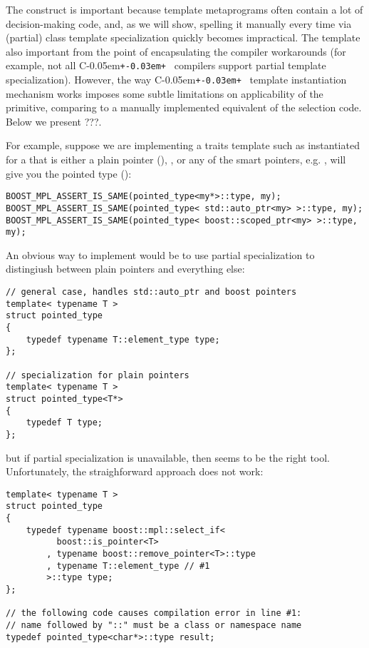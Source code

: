 \documentclass{netobjectdays}
\newcommand{\Cpp}{C\kern-0.05em\texttt{+\kern-0.03em+}%
}
\newcommand{\mpgms}{meta\-programs}
\begin{document}
The construct is important because template \mpgms{} often 
contain a lot of decision-making code, and, as we will show, 
spelling it manually every time via (partial) class template 
specialization quickly becomes impractical. The template also 
important from the point of encapsulating the compiler 
workarounds (for example, not all \Cpp\ compilers support 
partial template specialization). However, the way \Cpp\ 
template instantiation mechanism works imposes some subtle 
limitations on applicability of the primitive, comparing to 
a manually implemented equivalent of the selection code. 
Below we present ???.


For example, suppose we are implementing a 
traits template such as  
instantiated for a  that is either a plain pointer 
(), , or any of the 
smart pointers, e.g. \code{boost::scoped\_ptr<U>}, will give you 
the pointed type (\code{U}):

{\footnotesize
\begin{verbatim}
BOOST_MPL_ASSERT_IS_SAME(pointed_type<my*>::type, my);
BOOST_MPL_ASSERT_IS_SAME(pointed_type< std::auto_ptr<my> >::type, my);
BOOST_MPL_ASSERT_IS_SAME(pointed_type< boost::scoped_ptr<my> >::type, my);
\end{verbatim}
}

An obvious way to implement  would be to 
use partial specialization to distingiush between plain 
pointers and everything else:

{\footnotesize
\begin{verbatim}
// general case, handles std::auto_ptr and boost pointers
template< typename T >
struct pointed_type
{
    typedef typename T::element_type type;
};

// specialization for plain pointers
template< typename T >
struct pointed_type<T*>
{
    typedef T type;
};
\end{verbatim}
}

but if partial specialization is unavailable, then 
 seems to be the right tool. Unfortunately,
the straighforward approach does not work:

{\footnotesize
\begin{verbatim}
template< typename T >
struct pointed_type
{
    typedef typename boost::mpl::select_if<
          boost::is_pointer<T>
        , typename boost::remove_pointer<T>::type
        , typename T::element_type // #1
        >::type type;
};

// the following code causes compilation error in line #1:
// name followed by "::" must be a class or namespace name
typedef pointed_type<char*>::type result;
\end{verbatim}
}
\end{document}
